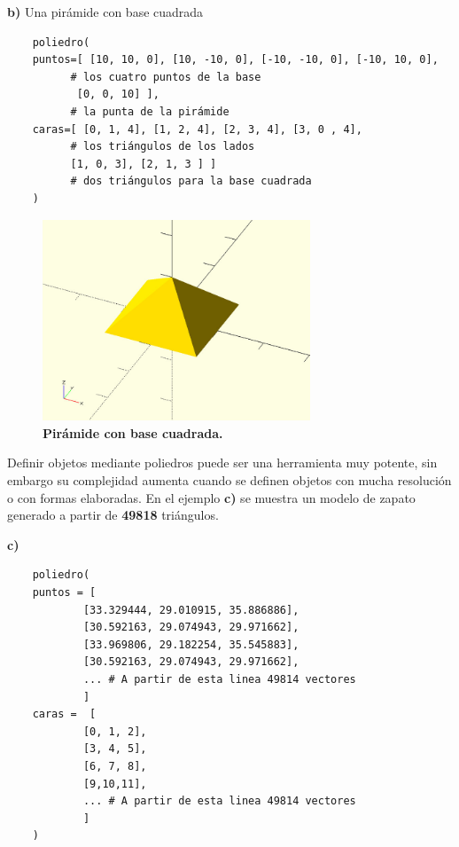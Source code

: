 \clearpage
\textbf{b)} Una pirámide con base cuadrada

\begin{verbatim}
    poliedro(
    puntos=[ [10, 10, 0], [10, -10, 0], [-10, -10, 0], [-10, 10, 0], 
          # los cuatro puntos de la base
           [0, 0, 10] ],  
          # la punta de la pirámide                                
    caras=[ [0, 1, 4], [1, 2, 4], [2, 3, 4], [3, 0 , 4],               
          # los triángulos de los lados
          [1, 0, 3], [2, 1, 3 ] ]                         
          # dos triángulos para la base cuadrada
    )

\end{verbatim}

\begin{figure}[h]
\includegraphics[width=8cm]{Img/Modelos/modelado10.jpg}
\centering
\caption{\textbf{ \footnotesize{Pirámide con base cuadrada.}}}
\end{figure}

\clearpage
Definir objetos mediante poliedros puede ser una herramienta muy potente, sin embargo su complejidad aumenta cuando se definen objetos con mucha resolución o con formas elaboradas. En el ejemplo \textbf{c)} se muestra un modelo de zapato generado a partir de \textbf{49818} triángulos. 

\textbf{c)} 

\begin{verbatim}
    poliedro(
    puntos = [
        	[33.329444, 29.010915, 35.886886],
        	[30.592163, 29.074943, 29.971662],
        	[33.969806, 29.182254, 35.545883],
        	[30.592163, 29.074943, 29.971662],
        	... # A partir de esta linea 49814 vectores
        	]
    caras =  [
        	[0, 1, 2],
        	[3, 4, 5],
        	[6, 7, 8],
        	[9,10,11],
        	... # A partir de esta linea 49814 vectores
        	]
    )

\end{verbatim}

